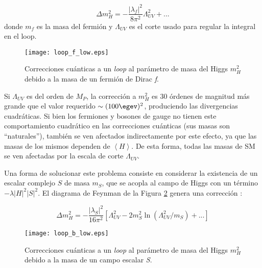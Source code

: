 \begin{equation}
\Delta m_{H}^{2}=-\frac{|\lambda_{f}|^{2}}{8\pi^{2}}\Lambda_{UV}^{2}+...
\label{fermion_corr}
\end{equation}
donde $m_{f}$ es la masa del fermión y $\Lambda_{UV}$ es el corte usado para regular la integral en el loop. 

\begin{figure}[ht]
\centering
\texttt{[image: loop\_f\_low.eps]}
\caption{Correcciones cuánticas a un \textit{loop} al parámetro de masa del Higgs $m_{H}^{2}$ debido a la masa
de un fermión de Dirac \textit{f}.}
\label{loop_f}
\end{figure}

Si $\Lambda_{UV}$ es del orden de $M_{P}$, la corrección a $m_{H}^{2}$ es 30 órdenes de magnitud más grande que el valor requerido $\sim (100 \egev)^{2}$, produciendo las divergencias cuadráticas. Si bien los fermiones y bosones de gauge no tienen este comportamiento cuadrático en las correcciones cuánticas (sus masas son “naturales”), también se ven afectados indirectamente por este efecto, ya que las masas de los mismos dependen de $\left\langle H \right\rangle$. De esta forma, todas las masas de SM se ven afectadas por la escala de corte $\Lambda_{UV}$.

Una forma de solucionar este problema consiste en considerar la existencia de un escalar complejo $S$ de masa $m_{S}$, que se acopla al campo de Higgs con un término $-\lambda |H|^{2}|S|^{2}$. El diagrama de Feynman de la Figura \ref{loop_b} genera una corrección :

\begin{equation}
\Delta m_{H}^{2}=-\frac{|\lambda_{S}|^{2}}{16\pi^{2}}\left[\Lambda_{UV}^{2}-2m_{S}^{2}\ln(\Lambda_{UV}^{2}/m_{S})+...\right]
\label{boson_corr}
\end{equation}

\begin{figure}[ht]
\centering
\texttt{[image: loop\_b\_low.eps]}
\caption{Correcciones cuánticas a un \textit{loop} al parámetro de masa del Higgs $m_{H}^{2}$ debido a la masa
de un campo escalar \textit{S}.}
\label{loop_b}
\end{figure}

